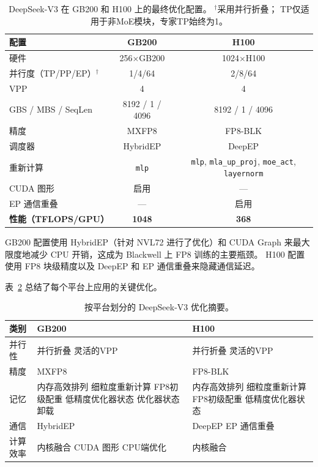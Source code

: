 \documentclass[10pt,logo,copyright]{nvidiatechreport_zh}
\begin{document}
\begin{table}[ht]
\centering
\caption{DeepSeek-V3 在 GB200 和 H100 上的最终优化配置。 $^\dagger$采用并行折叠； TP仅适用于非MoE模块，专家TP始终为1。}
\label{tab:deepseekv3-config}
\begin{tabular}{lcc}
\toprule
\textbf{配置} & \textbf{GB200} & \textbf{H100} \\
\midrule
硬件 & 256$\times$GB200 & 1024$\times$H100 \\
并行度（TP/PP/EP）$^\dagger$ & 1/4/64 & 2/8/64 \\
VPP & 4 & 4 \\
GBS / MBS / SeqLen & 8192 / 1 / 4096 & 8192 / 1 / 4096 \\
精度 & MXFP8 & FP8-BLK \\
调度器 & HybridEP & DeepEP \\
重新计算 & \texttt{mlp} & \texttt{mlp}, \texttt{mla\_up\_proj}, \texttt{moe\_act}, \texttt{layernorm} \\
CUDA 图形 & 启用 & --- \\
EP 通信重叠 & --- & 启用 \\
\midrule
\textbf{性能（TFLOPS/GPU）} & \textbf{1048} & \textbf{368} \\
\bottomrule
\end{tabular}
\end{table}

GB200 配置使用 HybridEP（针对 NVL72 进行了优化）和 CUDA Graph 来最大限度地减少 CPU 开销，这成为 Blackwell 上 FP8 训练的主要瓶颈。 H100 配置使用 FP8 块级精度以及 DeepEP 和 EP 通信重叠来隐藏通信延迟。

表~\ref{tab:deepseekv3-journey} 总结了每个平台上应用的关键优化。

\begin{table}[ht]
\centering
\caption{按平台划分的 DeepSeek-V3 优化摘要。}
\label{tab:deepseekv3-journey}
\begin{tabular}{lp{5cm}p{5cm}}
\toprule
\textbf{类别} & \textbf{GB200} & \textbf{H100} \\
\midrule
并行性 & 并行折叠 \newline 灵活的VPP & 并行折叠 \newline 灵活的VPP \\
\midrule
精度 & MXFP8 & FP8-BLK \\
\midrule
记忆 & 内存高效排列 \newline 细粒度重新计算 \newline FP8初级配重 \newline 低精度优化器状态 \newline 优化器状态卸载 & 内存高效排列 \newline 细粒度重新计算 \newline FP8初级配重 \newline 低精度优化器状态 \\
\midrule
通信 & HybridEP & DeepEP \newline EP 通信重叠 \\
\midrule
计算效率 & 内核融合 \newline CUDA 图形 \newline CPU端优化 & 内核融合 \\
\bottomrule
\end{tabular}
\end{table}
\end{document}
